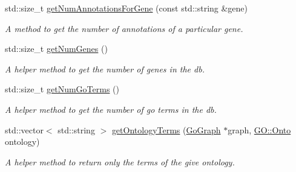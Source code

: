 \begin{DoxyCompactItemize}
std\+::size\+\_\+t \hyperlink{classAnnotationData_a367c90051704e541d674d1ee222e6bbe}{get\+Num\+Annotations\+For\+Gene} (const std\+::string \&gene)
\begin{DoxyCompactList}\small\item\em A method to get the number of annotations of a particular gene. \end{DoxyCompactList}\item 
std\+::size\+\_\+t \hyperlink{classAnnotationData_aa3eeff87e44cc21e06cc5f49899cf776}{get\+Num\+Genes} ()
\begin{DoxyCompactList}\small\item\em A helper method to get the number of genes in the db. \end{DoxyCompactList}\item 
std\+::size\+\_\+t \hyperlink{classAnnotationData_ad47dc3da1210218c0bb90ca80f6355ec}{get\+Num\+Go\+Terms} ()
\begin{DoxyCompactList}\small\item\em A helper method to get the number of go terms in the db. \end{DoxyCompactList}\item 
std\+::vector$<$ std\+::string $>$ \hyperlink{classAnnotationData_a25a5ccfa938a1d623e8f162f2959d951}{get\+Ontology\+Terms} (\hyperlink{classGoGraph}{Go\+Graph} $\ast$graph, \hyperlink{namespaceGO_a5ae335887b5cf40a9ef3045be9247fc3}{G\+O\+::\+Onto} ontology)
\begin{DoxyCompactList}\small\item\em A helper method to return only the terms of the give ontology. \end{DoxyCompactList}\end{DoxyCompactItemize}
